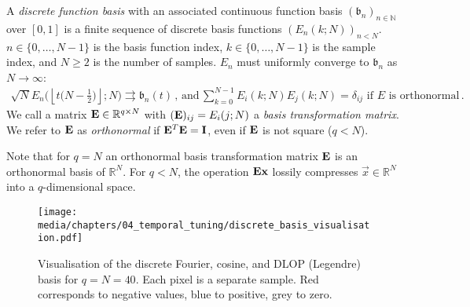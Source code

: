 \begin{definition}
	\label{def:discrete_function_basis}
 	A \emph{discrete function basis} with an associated continuous function basis $(\mathfrak{b}_n)_{n \in \mathbb{N}}$ over $[0, 1]$ is a finite sequence of discrete basis functions $(E_n(k; N))_{n < N}$.
 	$n \in \{0, \ldots, N - 1\}$ is the basis function index, $k \in \{0, \ldots, N - 1\}$ is the sample index, and $N \geq 2$ is the number of samples. $E_n$ must uniformly converge to $\mathfrak{b}_n$ as $N \to \infty$:
 	\begin{align}
 		\sqrt{N} E_n \bigl(\left\lfloor t \bigl(N - \tfrac{1}2\bigr) \right\rfloor ; N \bigr) \rightrightarrows \mathfrak{b}_n(t) \,,
 		\,\text{and}\,
 		\sum\nolimits_{k = 0}^{N - 1} E_i(k; N) E_j(k; N) = \delta_{ij} \text{ if } E \text{ is orthonormal}\,.
 		\label{eqn:discrete_basis}
 	\end{align}
 	We call a matrix $\mathbf{E} \in \mathbb{R}^{q \times N}$ with $(\mathbf{E})_{ij} = E_i(j; N)$ a \emph{basis transformation matrix}.
	We refer to $\mathbf{E}$ as \emph{orthonormal} if $\mathbf{E}^T \mathbf{E} = \mathbf{I}$, even if $\mathbf{E}$ is not square ($q < N$).
\end{definition}

Note that for $q = N$ an orthonormal basis transformation matrix $\mathbf{E}$ is an orthonormal basis of $\mathbb{R}^N$.
For $q < N$, the operation $\mathbf{E} \mathbf{x}$ lossily compresses $\vec x \in \mathbb{R}^N$ into a $q$-dimensional space.

\begin{figure}[t]
	\centering
	\texttt{[image: media/chapters/04\_temporal\_tuning/discrete\_basis\_visualisation.pdf]}%
	{\label{fig:discrete_fourier}}%
	{\label{fig:discrete_cosine}}%
	{\label{fig:discrete_dlop}}%
	\caption[Visualisation of the discrete Fourier, cosine, and Legendre basis]{Visualisation of the discrete Fourier, cosine, and DLOP (Legendre) basis for $q = N = 40$.
	Each pixel is a separate sample. Red corresponds to negative values, blue to positive, grey to zero.}
\end{figure}

